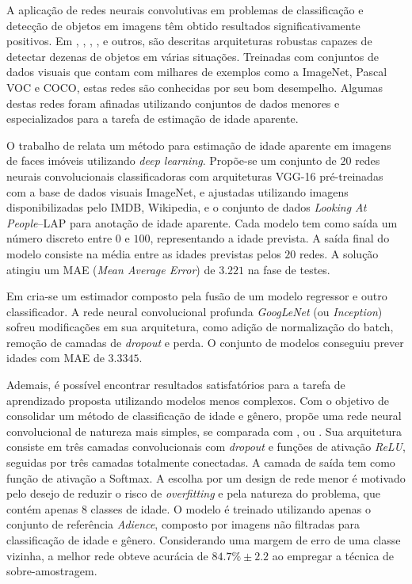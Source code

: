 
A aplicação de redes neurais convolutivas em problemas de classificação e detecção de objetos em imagens têm obtido resultados significativamente positivos. Em \cite{vggnet}, \cite{resnet}, \cite{inception}, \cite{redmon2016you}, \cite{ssd} e outros, são descritas arquiteturas robustas capazes de detectar dezenas de objetos em várias situações. Treinadas com conjuntos de dados visuais que contam com milhares de exemplos como a ImageNet, Pascal VOC e COCO, estas redes são conhecidas por seu bom desempelho. Algumas destas redes foram afinadas utilizando conjuntos de dados menores e especializados para a tarefa de estimação de idade aparente.

O trabalho de \cite{rothe2015dex} relata um método para estimação de idade aparente em imagens de faces imóveis utilizando \emph{deep learning}. Propõe-se um conjunto de $20$ redes neurais convolucionais classificadoras com arquiteturas VGG-16 pré-treinadas com a base de dados visuais ImageNet, e ajustadas utilizando imagens disponibilizadas pelo IMDB, Wikipedia, e o conjunto de dados \emph{Looking At People}--LAP para anotação de idade aparente. Cada modelo tem como saída um número discreto entre $0$ e $100$, representando a idade prevista. A saída final do modelo consiste na média entre as idades previstas pelos $20$ redes. A solução atingiu um MAE (\emph{Mean Average Error}) de $3.221$ na fase de testes.

Em \cite{liu2015agenet} cria-se um estimador composto pela fusão de um modelo regressor e outro classificador. A rede neural convolucional profunda \emph{GoogLeNet} (ou \emph{Inception}) \cite{inception} sofreu modificações em sua arquitetura, como adição de normalização do batch, remoção de camadas de \emph{dropout} e perda. O conjunto de modelos conseguiu prever idades com MAE de $3.3345$.

Ademais, é possível encontrar resultados satisfatórios para a tarefa de aprendizado proposta utilizando modelos menos complexos. Com o objetivo de consolidar um método de classificação de idade e gênero, \cite{levi2015age} propõe uma rede neural convolucional de natureza mais simples, se comparada com \cite{inception}, \cite{vggnet} ou \cite{resnet}. Sua arquitetura consiste em três camadas convolucionais com \emph{dropout} e funções de ativação \emph{ReLU}, seguidas por três camadas totalmente conectadas. A camada de saída tem como função de ativação a Softmax. A escolha por um design de rede menor é motivado pelo desejo de reduzir o risco de \emph{overfitting} e pela natureza do problema, que contém apenas 8 classes de idade. O modelo é treinado utilizando apenas o conjunto de referência \emph{Adience}, composto por imagens não filtradas para classificação de idade e gênero. Considerando uma margem de erro de uma classe vizinha, a melhor rede obteve acurácia de $84.7\% \pm 2.2$ ao empregar a técnica de sobre-amostragem.
